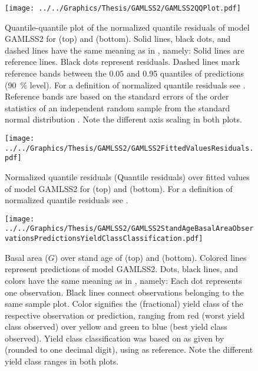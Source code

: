 \begin{figure}[h]
  \centering
  \texttt{[image: ../../Graphics/Thesis/GAMLSS2/GAMLSS2QQPlot.pdf]}
  \caption{Quantile-quantile plot of the normalized quantile residuals of model GAMLSS2 for \Beech{} (top) and \Spruce{} (bottom). Solid lines, black dots, and dashed lines have the same meaning as in , namely:  Solid lines are reference lines.  Black dots represent residuals.  Dashed lines mark reference bands between the \num{0.05} and \num{0.95} quantiles of predictions (\SI{90}{\percent} level).  For a definition of normalized quantile residuals see \textcite{Dunn1996}.  Reference bands are based on the standard errors of the order statistics of an independent random sample from the standard normal distribution \parencite{Fox2016}.  Note the different axis scaling in both plots.}
  \label{fig:GAMLSS2QQPlot}
\end{figure}

\begin{figure}[h]
  \centering
  \texttt{[image: ../../Graphics/Thesis/GAMLSS2/GAMLSS2FittedValuesResiduals.pdf]}
  \caption{Normalized quantile residuals (Quantile residuals) over fitted values of model GAMLSS2 for \Beech{} (top) and \Spruce{} (bottom).  For a definition of normalized quantile residuals see \textcite{Dunn1996}.}
  \label{fig:GAMLSS2FittedValuesResiduals}
\end{figure}

\begin{figure}[h]
  \centering
  \texttt{[image: ../../Graphics/Thesis/GAMLSS2/GAMLSS2StandAgeBasalAreaObservationsPredictionsYieldClassClassification.pdf]}
  \caption{Basal area (\(G\)) over stand age of \Beech{} (top) and \Spruce{} (bottom).  Colored lines represent predictions of model GAMLSS2.  Dots, black lines, and colors have the same meaning as in , namely:  Each dot represents one observation.  Black lines connect observations belonging to the same sample plot.  Color signifies the (fractional) yield class of the respective observation or prediction, ranging from red (worst yield class observed) over yellow and green to blue (best yield class observed).  Yield class classification was based on \ProductivityIndexText{} as given by  (rounded to one decimal digit), using  as reference.  Note the different yield class ranges in both plots.}
  \label{fig:GAMLSS2StandAgeBasalAreaObservationsPredictionsYieldClassClassification}
\end{figure}


